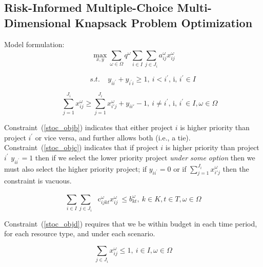 \subsection{Risk-Informed Multiple-Choice Multi-Dimensional Knapsack Problem Optimization}
\label{subsec:RImckp}

Model formulation:\\

\begin{equation}\label{stoc_obja}
\mathop{\max}_{x,y} \sum _{ \omega  \in  \Omega }^{}q^{ \omega } \sum _{i \in I}^{} \sum _{j \in J_{i}}^{}a_{ij}^{ \omega }x_{ij}^{ \omega }
\end{equation}

\begin{equation}\label{stoc_objb}
~~~~~~~~~~~~s.t.~~~~~y_{ii^{'}}+y_{i^{'}i} \geq 1,~ i<i^{'}\text{, i, }i^{'} \in I
\end{equation}

\begin{equation}\label{stoc_objc}
~~~~~~~~\sum_{j=1}^{J_i} x_{ij}^\omega \geq \sum_{j=1}^{J_i} x_{i'j}^\omega + y_{ii'} -1,~ i \neq i^{'}\text{, i, }i^{'} \in I,  \omega  \in  \Omega
\end{equation}

Constraint~(\ref{stoc_objb}) indicates that either project $i$  is higher priority
than project  $i^{'}$  or vice versa, and further allows both (i.e., a tie).
Constraint~(\ref{stoc_objc}) indicates that if project  $i$  is higher priority than
project  $i^{'}$  $y_{ii^{'}}=1$  then if we select the lower priority project
\textit{under some option} then we must also select the higher priority project;
if  $y_{ii^{'}}=0$  or if  $\sum_{j=1}^{J_i} x_{i'j}^\omega$  then the constraint is vacuous.\par

\begin{equation}\label{stoc_objd}
 \sum _{i \in I}^{} \sum _{j \in J_{i}}^{}\text{~ c}_{ijkt}^{ \omega }x_{ij}^{ \omega }~  \leq  b_{kt}^{ \omega },~ k \in K, t \in T,  \omega  \in  \Omega
\end{equation}

Constraint~(\ref{stoc_objd}) requires that we be within budget in each time period,
for each resource type, and under each scenario.

\begin{equation}\label{stoc_obje}
\sum_{j\in J_i} x_{ij}^{ \omega } \leq 1,~ i \in I, \omega  \in  \Omega
\end{equation}

